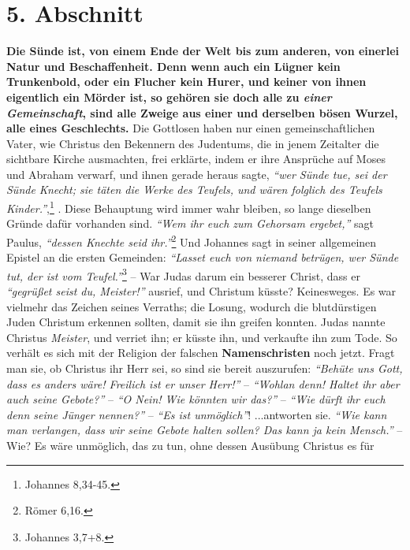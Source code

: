 \section{5. Abschnitt} \label{kap1_ab5}

\label{ref:01_05_in_suende_gleich}
\textbf{Die Sünde
ist, von einem Ende der Welt bis zum anderen, von einerlei Natur und
Beschaffenheit. Denn wenn auch ein Lügner kein Trunkenbold, oder ein Flucher
kein Hurer, und keiner von ihnen eigentlich ein Mörder ist, so gehören sie doch
alle zu \textit{einer Gemeinschaft}, sind alle Zweige aus einer und derselben
bösen Wurzel, alle eines Geschlechts.} Die Gottlosen haben nur einen
gemeinschaftlichen Vater, wie Christus den Bekennern des Judentums, die in
jenem Zeitalter die sichtbare Kirche ausmachten, frei erklärte, indem er ihre
Ansprüche auf Moses und Abraham  
verwarf, und ihnen gerade heraus sagte,
\textit{"`wer Sünde tue, sei der Sünde Knecht; sie täten die Werke des Teufels,
und wären folglich des Teufels Kinder."'},\footnote{Johannes 8,34-45.}
.
Diese Behauptung wird immer wahr bleiben,
so lange dieselben Gründe dafür vorhanden sind.
\textit{"`Wem ihr euch zum Gehorsam ergebet,"'} sagt Paulus, \textit{"`dessen
Knechte seid ihr."'}\footnote{Römer 6,16.}
Und Johannes sagt in seiner allgemeinen Epistel an die ersten Gemeinden:
\textit{"`Lasset euch von niemand betrügen, wer Sünde tut, der ist vom Teufel."'}\footnote{Johannes 3,7+8.}
-- War Judas  darum ein besserer Christ, dass er
\textit{"`gegrüßet seist du, Meister!"'} ausrief, und Christum küsste?
Keinesweges. Es war vielmehr das Zeichen seines Verraths;
die Losung, wodurch die blutdürstigen Juden Christum erkennen sollten, damit sie
ihn greifen konnten. Judas nannte Christus \textit{Meister}, und verriet ihn;
er küsste ihn, und verkaufte ihn zum Tode.
So verhält es sich mit der Religion der falschen \textbf{Namenschristen}
 noch jetzt.
Fragt man sie, ob Christus ihr Herr sei,
so sind sie bereit auszurufen:
\textit{"`Behüte uns Gott, dass es anders wäre! Freilich ist er unser Herr!"'}
-- \textit{"`Wohlan denn! Haltet ihr aber auch seine Gebote?"'}
-- \textit{"`O Nein! Wie könnten wir das?"'}
-- \textit{"`Wie dürft ihr euch denn seine Jünger nennen?"'}
-- \textit{"`Es ist unmöglich"'}!
...antworten sie.
\textit{"`Wie kann man verlangen, dass wir seine Gebote halten sollen? Das kann
ja kein Mensch."'}
-- Wie? Es wäre unmöglich, das zu tun, ohne dessen Ausübung Christus es für
